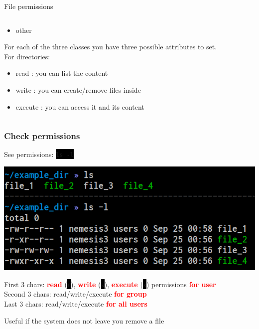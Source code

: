 \documentclass[unknownkeysallowed, 10pt, a4 paper, handout]{beamer}
\newcommand{\focus}[1]{\textbf{\textcolor{red}{#1}}}
\newcommand{\code}[1]{\colorbox{black}{\color{green}\texttt{#1}}}
\newcommand{\sidebyside}[5]{
  \begin{minipage}{#1\textwidth}
    #2
  \end{minipage} #3 \begin{minipage}{#4\textwidth}
    #5
  \end{minipage}
}
\begin{document}
\begin{frame}[label=permission]{File permissions}
\begin{columns}[T]
\begin{column}{.89\textwidth}
{\begin{itemize}
         \item other
      \end{itemize}
      For each of the three classes you have three possible attributes
      to set. \\
      \vspace{10pt}
      For directories:
      \begin{itemize}
         \item read : you can list the content
         \item write : you can create/remove files inside
         \item execute : you can access it and its content
      \end{itemize}
    }
    \end{column}
  \end{columns}
\end{frame}


\begin{frame}
  \begin{center}
    \frametitle{Check permissions}

    \sidebyside{0.44}{
      \centering
      See permissions: \code{ls -l}
    }{\hfill}{0.52}{
      \begin{center}
        \includegraphics[width=1.00\textwidth]{pics/ls-l.png}
      \end{center}
    }

    First 3 chars: \focus{read} (\code{r}), \focus{write} (\code{w}), \focus{execute} (\code{x}) permissions \focus{for user}\\
    Second 3 chars: read/write/execute \focus{for group}\\
    Last 3 chars: read/write/execute \focus{for all users}

    Useful if the system does not leave you remove a file
  \end{center}
\end{frame}
\end{document}
